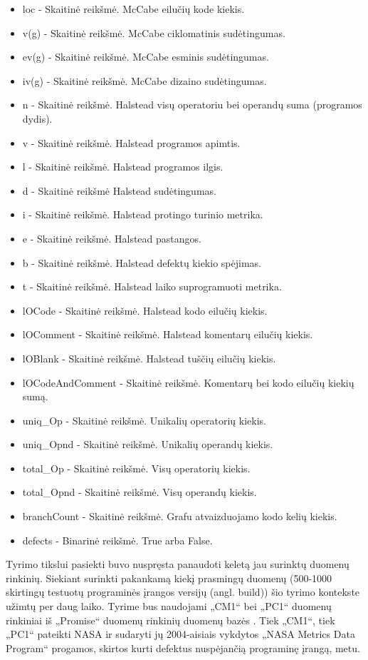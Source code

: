 \documentclass{VUMIFPSbakalaurinis}
\begin{document}
\begin{itemize} 
\item[] loc - Skaitinė reikšmė. McCabe eilučių kode kiekis.
\item[] v(g) - Skaitinė reikšmė. McCabe ciklomatinis sudėtingumas.
\item[] ev(g) - Skaitinė reikšmė. McCabe esminis sudėtingumas.
\item[] iv(g) - Skaitinė reikšmė. McCabe dizaino sudėtingumas.
\item[] n - Skaitinė reikšmė. Halstead visų operatoriu bei operandų suma (programos dydis).
\item[] v - Skaitinė reikšmė. Halstead programos apimtis.
\item[] l - Skaitinė reikšmė. Halstead programos ilgis.
\item[] d - Skaitinė reikšmė Halstead sudėtingumas.
\item[] i - Skaitinė reikšmė. Halstead protingo turinio metrika.
\item[] e - Skaitinė reikšmė. Halstead pastangos.
\item[] b - Skaitinė reikšmė. Halstead defektų kiekio spėjimas.
\item[] t - Skaitinė reikšmė. Halstead laiko suprogramuoti metrika.
\item[] lOCode - Skaitinė reikšmė. Halstead kodo eilučių kiekis.
\item[] lOComment - Skaitinė reikšmė. Halstead komentarų eilučių kiekis.
\item[] lOBlank - Skaitinė reikšmė. Halstead tuščių eilučių kiekis.
\item[] lOCodeAndComment - Skaitinė reikšmė. Komentarų bei kodo eilučių kiekių sumą.
\item[] uniq\_Op - Skaitinė reikšmė. Unikalių operatorių kiekis.
\item[] uniq\_Opnd - Skaitinė reikšmė. Unikalių operandų kiekis.
\item[] total\_Op - Skaitinė reikšmė. Visų operatorių kiekis.
\item[] total\_Opnd - Skaitinė reikšmė. Visų operandų kiekis.
\item[] branchCount - Skaitinė reikšmė. Grafu atvaizduojamo kodo kelių kiekis.
\item[] defects - Binarinė reikšmė. True arba False.
\end{itemize} 

Tyrimo tikslui pasiekti buvo nuspręsta panaudoti keletą jau surinktų duomenų rinkinių. Siekiant surinkti pakankamą kiekį prasmingų duomenų (500-1000 skirtingų testuotų programinės įrangos versijų (angl. build)) šio tyrimo kontekste užimtų per daug laiko. Tyrime bus naudojami  „CM1“ bei „PC1“ duomenų rinkiniai iš  „Promise“ duomenų rinkinių duomenų bazės \cite{Sayyad-Shirabad+Menzies:2005}. Tiek „CM1“, tiek „PC1“ pateikti NASA ir sudaryti jų 2004-aisiais vykdytos „NASA Metrics Data Program“ progamos, skirtos kurti defektus nuspėjančią programinę įrangą, metu.
\end{document}
